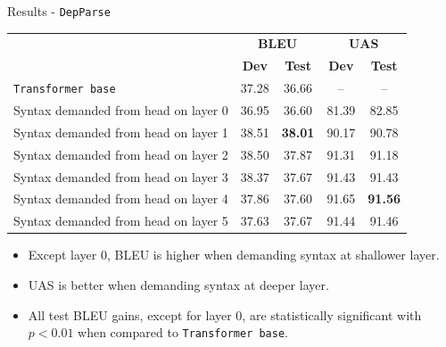 \documentclass{beamer}
\def\transformerbase{\texttt{Transformer base}\xspace}
\def\DepParse{\texttt{DepParse}\xspace}
\begin{document}
\begin{frame}{Results - \DepParse}
\begin{table}[t]
\small
\centering
\vspace{2ex}
  \begin{tabular}{lcc|cc}
    &  \multicolumn{2}{c}{\textbf{BLEU}} & \multicolumn{2}{|c}{\textbf{UAS}} \\
    & \textbf{Dev} & \textbf{Test} & \textbf{Dev} & \textbf{Test} \\
    \hline
    \transformerbase & 37.28 & 36.66 & -- & -- \\
    \hline
    Syntax demanded from head on layer 0 & 36.95 & 36.60 & 81.39 & 82.85 \\
    Syntax demanded from head on layer 1 & 38.51 & \textbf{38.01} & 90.17 & 90.78 \\
    Syntax demanded from head on layer 2 & 38.50 & 37.87 & 91.31 & 91.18 \\
    Syntax demanded from head on layer 3 & 38.37 & 37.67 & 91.43 & 91.43 \\
    Syntax demanded from head on layer 4 & 37.86 & 37.60 & 91.65 & \textbf{91.56} \\
    Syntax demanded from head on layer 5 & 37.63 & 37.67 & 91.44 & 91.46 \\
  \end{tabular}
\end{table}
\begin{itemize}
    \item Except layer 0, BLEU is higher when demanding syntax at shallower layer.
    \item UAS is better when demanding syntax at deeper layer.
    \item All test BLEU gains, except for layer 0, are statistically significant with $p<0.01$ when compared to \transformerbase.
\end{itemize}
\end{frame}

\end{document}
